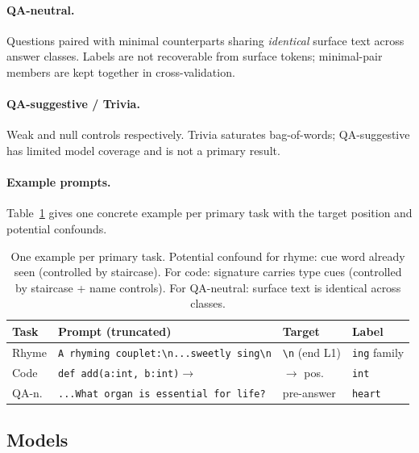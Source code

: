 \documentclass[11pt]{article}
\begin{document}
\paragraph{QA-neutral.} Questions paired with minimal counterparts sharing
\emph{identical} surface text across answer classes. Labels are not recoverable
from surface tokens; minimal-pair members are kept together in cross-validation.

\paragraph{QA-suggestive / Trivia.} Weak and null controls respectively.
Trivia saturates bag-of-words; QA-suggestive has limited model coverage and is
not a primary result.

\paragraph{Example prompts.} Table~\ref{tab:examples} gives one concrete example
per primary task with the target position and potential confounds.

\begin{table}[t]
\centering\small
\setlength{\tabcolsep}{3pt}
\begin{tabular}{@{}lp{4.0cm}p{1.3cm}p{1.3cm}@{}}
\toprule
\textbf{Task} & \textbf{Prompt (truncated)} & \textbf{Target} & \textbf{Label} \\
\midrule
Rhyme & \texttt{A rhyming couplet:\textbackslash n...sweetly sing\textbackslash n} & \texttt{\textbackslash n} (end L1) & \texttt{ing} family \\
Code & \texttt{def add(a:int, b:int)$\to$} & \texttt{$\to$} pos. & \texttt{int} \\
QA-n. & \texttt{...What organ is essential for life?} & pre-answer & \texttt{heart} \\
\bottomrule
\end{tabular}
\caption{One example per primary task. Potential confound for rhyme: cue word already
seen (controlled by staircase). For code: signature carries type cues (controlled by
staircase + name controls). For QA-neutral: surface text is identical across classes.}
\label{tab:examples}
\end{table}

\subsection{Models}
\label{sec:models}
\end{document}
